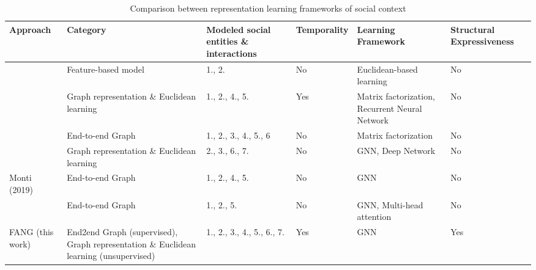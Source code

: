 \documentclass[fyp]{socreport}
\theoremstyle{definition}
\theoremstyle{hypothesis}
\begin{document}
\begin{table}[t]
  \centering
  \tiny
  \begin{tabular}{|p{2.75cm}|p{3.5cm}|p{2.5cm}|p{1.25cm}|p{1.75cm}|p{1.75cm}|}
    \hline
    Approach & Category & Modeled social entities \& interactions & Temporality & Learning Framework & Structural Expressiveness \\ \hline \hline \cite{castillo2011information,ma2015detect,yang2012automatic} & Feature-based model & 1., 2. & No & Euclidean-based learning & No \\ \hline
    \cite{ruchansky2017csi} & Graph representation \& Euclidean learning & 1., 2., 4., 5. & Yes & Matrix factorization, Recurrent Neural Network & No \\ \hline
    \cite{shu2019beyond} & End-to-end Graph & 1., 2., 3., 4., 5., 6 & No & Matrix factorization & No \\ \hline
    \cite{kulkarni2018multi} & Graph representation \& Euclidean learning & 2., 3., 6., 7. & No & GNN, Deep Network  & No \\ \hline
    Monti (2019)~\cite{monti2019fake} & End-to-end Graph & 1., 2., 4., 5. & No & GNN & No \\ \hline
    \cite{yuan2019jointly} & End-to-end Graph & 1., 2., 5. & No & GNN, Multi-head attention & No \\ \hline \hline
    FANG (this work) & End2end Graph (supervised), Graph representation \& Euclidean learning (unsupervised) & 1., 2., 3., 4., 5., 6., 7. & Yes & GNN & Yes \\ \hline
    
  \end{tabular}
  \caption{Comparison between representation learning frameworks of social context}
  \label{table:literature_review}
\end{table}
\end{document}
